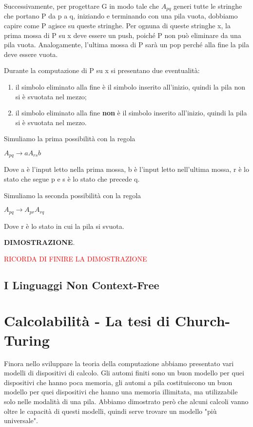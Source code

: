 \documentclass{article}
\begin{document}
Successivamente, per progettare G in modo tale che $A_{pq}$ generi tutte le
stringhe che portano P da p a q, iniziando e terminando con una pila vuota,
dobbiamo capire come P agisce su queste stringhe. Per ognuna di queste stringhe
x, la prima mossa di P su x deve essere un push, poiché P non può eliminare da
una pila vuota. Analogamente, l'ultima mossa di P sarà un pop perché alla fine
la pila deve essere vuota.

Durante la computazione di P su x si presentano due eventualità:

\begin{enumerate}
    \item il simbolo eliminato alla fine è il simbolo inserito all'inizio,
    quindi la pila non si è svuotata nel mezzo;
    \item il simbolo eliminato alla fine \textbf{non} è il simbolo inserito
    all'inizio, quindi la pila si è svuotata nel mezzo.
\end{enumerate}

Simuliamo la prima possibilità con la regola

\begin{center}
    $A_{pq} \rightarrow aA_{rs}b$
\end{center}

Dove a è l'input letto nella prima mossa, b è l'input letto nell'ultima mossa, r
è lo stato che segue p e s è lo stato che precede q.

Simuliamo la seconda possibilità con la regola

\begin{center}
    $A_{pq} \rightarrow A_{pr}A_{rq}$
\end{center}

Dove r è lo stato in cui la pila si svuota.

\textbf{DIMOSTRAZIONE}. 

\textcolor{red}{RICORDA DI FINIRE LA DIMOSTRAZIONE}

\subsection{I Linguaggi Non Context-Free}

\section{Calcolabilità - La tesi di Church-Turing}

Finora nello sviluppare la teoria della computazione abbiamo presentato vari
modelli di dispositivi di calcolo. Gli automi finiti sono un buon modello per
quei dispositivi che hanno poca memoria, gli automi a pila costituiscono un buon
modello per quei dispositivi che hanno una memoria illimitata, ma utilizzabile
solo nelle modalità di una pila. Abbiamo dimostrato però che alcuni calcoli
vanno oltre le capacità di questi modelli, quindi serve trovare un modello "più
universale".
\end{document}
